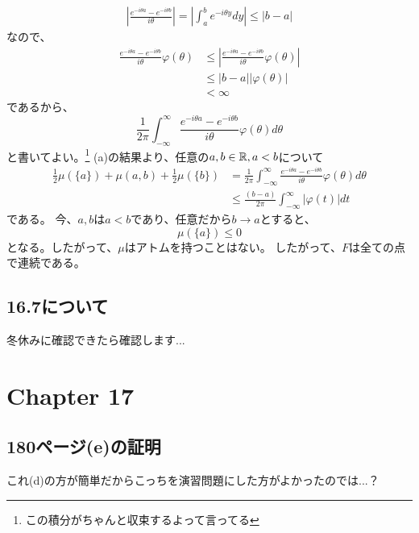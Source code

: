     \begin{align*}
      \left|\frac{e^{-i\theta a} - e^{-i\theta b}}{i\theta} \right| =
      \left| \int_a^b e^{-i\theta y} dy \right| \leq |b - a|
    \end{align*}
    なので、
    \begin{align*}
      \frac{e^{-i\theta a} - e^{-i\theta b}}{i\theta}\varphi(\theta)
      &\leq \left| \frac{e^{-i\theta a} - e^{-i\theta b}}{i\theta}\varphi(\theta) \right|\\
      &\leq |b - a||\varphi(\theta)|\\
      &< \infty
    \end{align*}
    であるから、
    \[
      \frac{1}{2\pi} \int_{-\infty}^{\infty} \frac{e^{-i\theta a} - e^{-i\theta b}}{i\theta}\varphi(\theta) d\theta
    \]
    と書いてよい。\footnote{この積分がちゃんと収束するよって言ってる}
    (a)の結果より、任意の$a,b \in {\mathbb{R}}, a<b$について
    \begin{align*}
      \frac{1}{2}\mu(\{a\}) + \mu(a,b) + \frac{1}{2}\mu(\{b\})
      &= \frac{1}{2\pi} \int_{-\infty}^{\infty} \frac{e^{-i\theta a} - e^{-i\theta b}}{i\theta}\varphi(\theta) d\theta\\
      &\leq \frac{(b - a)}{2\pi}\int_{-\infty}^{\infty}|\varphi(t)|dt
    \end{align*}
    である。
    今、$a,b$は$a<b$であり、任意だから$b \to a$とすると、
    \[
      \mu(\{a\}) \leq 0
    \]
    となる。したがって、$\mu$はアトムを持つことはない。
    したがって、$F$は全ての点で連続である。

  \subsection{16.7について}
    冬休みに確認できたら確認します...

\section{Chapter 17}
  \subsection{180ページ(e)の証明}
    これ(d)の方が簡単だからこっちを演習問題にした方がよかったのでは...？

